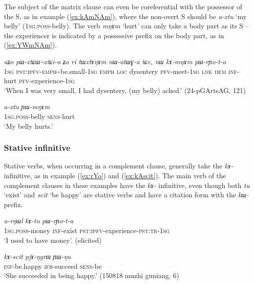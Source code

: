 \documentclass[oneside,a4paper,11pt]{article}
\newcommand{\ipa}[1]{\textit{\phon#1}}
\newcommand{\jpg}[2]{\ipa{#1} `#2'}
\newcommand{\tld}{\textasciitilde{}}
\newcommand{\refb}[1]{(\ref{#1})}
\begin{document}
The subject of the matrix clause can even be coreferential with the possessor of the S, as in example (\ref{ex:kAmNAm}), where the non-overt S should be \jpg{a-xtu}{my belly} (\textsc{1sg.poss}-belly). The verb \ipa{mŋɤm} `hurt' can only take a body part as its S -- the experiencer is indicated by a possessive prefix on the body part, as in \refb{ex:YWmNAm}.
 
 \begin{exe}
\ex \label{ex:kAmNAm}
\gll \ipa{aʑo} 	\ipa{pɯ-xtɕɯ\tld{}xtɕi-a} 	\ipa{ʑo} 	\ipa{ri} 	\ipa{tɯxtɤŋɤm} 	\ipa{nɯ-atɯɣ-a} 	\ipa{tɕe,} 	\ipa{nɯ} 	\ipa{kɤ-mŋɤm} 	\ipa{pɯ-rɲo-t-a} \\
\textsc{1sg} \textsc{pst:ipfv-emph}\tld{}be.small-\textsc{1sg} \textsc{emph} \textsc{loc} dysentery \textsc{pfv}-meet-\textsc{1sg} \textsc{lnk} \textsc{dem} \textsc{inf}-hurt \textsc{pfv}-experience-\textsc{1sg} \\
\glt `When I was very small, I had dysentery, (my belly) ached.'  (24-pGArtsAG, 121)
\end{exe}

 \begin{exe}
\ex \label{ex:YWmNAm}
\gll \ipa{a-xtu} 	\ipa{ɲɯ-mŋɤm} \\
\textsc{1sg.poss}-belly \textsc{sens}-hurt \\
\glt `My belly hurts.' 
\end{exe}


 
 \subsubsection{Stative infinitive} \label{sec:stative.inf}
Stative verbs, when occurring in a complement clause, generally take the \ipa{kɤ-} infinitive, as in example  (\ref{ex:rYo}) and (\ref{ex:kAscit}). The main verb of the complement clauses in these examples have the \ipa{kɤ-} infinitive, even though both \jpg{tu}{exist} and \jpg{scit}{be happy} are stative verbs and have a citation form with the \ipa{kɯ-} prefix.

\begin{exe}
\ex \label{ex:rYo}
\gll \ipa{a-rŋɯl} 	\ipa{kɤ-tu} 	\ipa{pɯ-rɲo-t-a} \\
\textsc{1sg.poss}-money \textsc{inf}-exist \textsc{pst:ipfv}-experience-\textsc{pst:tr-1sg} \\
\glt `I used to have money'. (elicited)
\end{exe}

\begin{exe}
\ex \label{ex:kAscit}
 \gll \ipa{kɤ-scit} 	\ipa{pjɤ-ŋgrɯ} 	\ipa{ɲɯ-ŋu}  \\
 \textsc{inf}-be.happy \textsc{ifr}-succeed \textsc{sens}-be \\
 \glt `She succeeded in being happy.' (150818 muzhi guniang, 6)
 \end{exe} 
 
\end{document}
